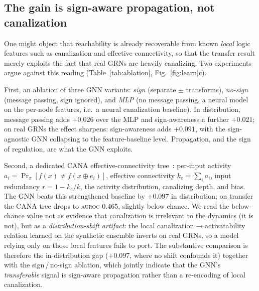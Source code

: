 \documentclass[journal]{IEEEtran}
\newcommand{\auroc}{\textsc{auroc}}
\begin{document}
\subsection{The gain is sign-aware propagation, not canalization}
\label{sec:ablation}
One might object that reachability is already recoverable from known \emph{local} logic
features such as canalization and effective connectivity, so that the transfer result
merely exploits the fact that real GRNs are heavily canalizing. Two experiments argue
against this reading (Table~\ref{tab:ablation},
Fig.~\ref{fig:learn}c).

First, an ablation of three GNN variants: \emph{sign} (separate $\pm$ transforms),
\emph{no-sign} (message passing, sign ignored), and \emph{MLP} (no message passing, a
neural model on the per-node features, i.e.\ a neural canalization baseline). In
distribution, message passing adds ${+}0.026$ over the MLP and sign-awareness a further
${+}0.021$; on real GRNs the effect sharpens: sign-awareness adds ${+}0.091$, with the
sign-agnostic GNN collapsing to the feature-baseline level. Propagation, and the sign of
regulation, are what the GNN exploits.

Second, a dedicated CANA effective-connectivity tree~\cite{cana}: per-input activity
$a_i=\Pr_x[f(x)\neq f(x\oplus e_i)]$, effective connectivity $k_e=\sum_i a_i$, input
redundancy $r=1-k_e/k$, the activity distribution, canalizing depth, and bias. The GNN
beats this strengthened baseline by ${+}0.097$ in distribution; on transfer the CANA
tree drops to \auroc{} $0.465$, slightly below chance. We read the below-chance value not
as evidence that canalization is irrelevant to the dynamics (it is not), but as a
\emph{distribution-shift artifact}: the local canalization$\to$activatability relation
learned on the synthetic ensemble inverts on real GRNs, so a model relying only on those
local features fails to port. The substantive comparison is therefore the in-distribution
gap ($+0.097$, where no shift confounds it) together with the sign\,/\,no-sign ablation,
which jointly indicate that the GNN's \emph{transferable} signal is sign-aware propagation
rather than a re-encoding of local canalization.
\end{document}
